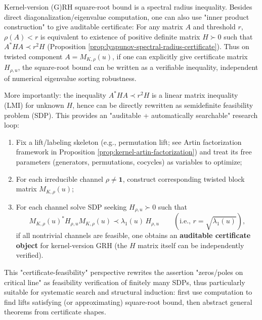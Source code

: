 \begin{remark}\label{rem:finite-rh-lyapunov}
Kernel-version (G)RH square-root bound is a spectral radius inequality. Besides direct diagonalization/eigenvalue computation, one can also use "inner product construction" to give auditable certificate:
For any matrix $A$ and threshold $r$, $\rho(A)<r$ is equivalent to existence of positive definite matrix $H\succ 0$ such that $A^\ast H A\prec r^2 H$ (Proposition \ref{prop:lyapunov-spectral-radius-certificate}).
Thus on twisted component $A=M_{K,\rho}(u)$, if one can explicitly give certificate matrix $H_{\rho,u}$, the square-root bound can be written as a verifiable inequality, independent of numerical eigenvalue sorting robustness.
\par
More importantly: the inequality
\(
A^\ast H A\prec r^2 H
\)
is a linear matrix inequality (LMI) for unknown \(H\), hence can be directly rewritten as semidefinite feasibility problem (SDP).
This provides an "auditable + automatically searchable" research loop:
\begin{enumerate}
  \item Fix a lift/labeling skeleton (e.g., permutation lift; see Artin factorization framework in Proposition \ref{prop:kernel-artin-factorization}) and treat its free parameters (generators, permutations, cocycles) as variables to optimize;
  \item For each irreducible channel \(\rho\neq\mathbf{1}\), construct corresponding twisted block matrix \(M_{K,\rho}(u)\);
  \item For each channel solve SDP seeking \(H_{\rho,u}\succ 0\) such that
  \[
  M_{K,\rho}(u)^\ast H_{\rho,u} M_{K,\rho}(u)\prec \lambda_1(u)\,H_{\rho,u}
  \qquad(\text{i.e., }r=\sqrt{\lambda_1(u)}),
  \]
  if all nontrivial channels are feasible, one obtains an \textbf{auditable certificate object} for kernel-version GRH (the \(H\) matrix itself can be independently verified).
\end{enumerate}
This "certificate-feasibility" perspective rewrites the assertion "zeros/poles on critical line" as feasibility verification of finitely many SDPs, thus particularly suitable for systematic search and structural induction: first use computation to find lifts satisfying (or approximating) square-root bound, then abstract general theorems from certificate shapes.
\end{remark}


